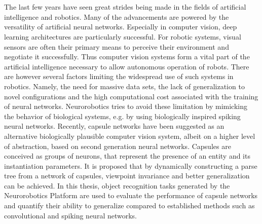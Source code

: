\chapter{\abstractname}
The last few years have seen great strides being made in the fields of artificial intelligence and robotics. Many of the advancements are powered by the versatility of artificial neural networks. Especially in computer vision, deep learning architectures are particularly successful. For robotic systems, visual sensors are often their primary means to perceive their environment and negotiate it successfully. Thus computer vision systems form a vital part of the artificial intelligence necessary to allow autonomous operation of robots. There are however several factors limiting the widespread use of such systems in robotics. Namely, the need for massive data sets, the lack of generalization to novel configurations and the high computational cost associated with the training of neural networks. Neurorobotics tries to avoid these limitation by mimicking the behavior of biological systems, e.g. by using biologically inspired spiking neural networks. Recently, capsule networks have been suggested as an alternative biologically plausible computer vision system, albeit on a higher level of abstraction, based on second generation neural networks. Capsules are conceived as groups of neurons, that represent the presence of an entity and its instantiation parameters. It is proposed that by dynamically constructing a parse tree from a network of capsules, viewpoint invariance and better generalization can be achieved. In this thesis, object recognition tasks generated by the Neurorobotics Platform are used to evaluate the performance of capsule networks and quantify their ability to generalize compared to established methods such as convolutional and spiking neural networks.